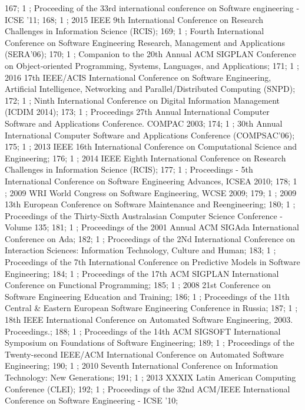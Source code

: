 167; 1 ; Proceeding of the 33rd international conference on Software engineering - ICSE '11; 
168; 1 ; 2015 IEEE 9th International Conference on Research Challenges in Information Science (RCIS); 
169; 1 ; Fourth International Conference on Software Engineering Research, Management and Applications (SERA'06); 
170; 1 ; Companion to the 20th Annual ACM SIGPLAN Conference on Object-oriented Programming, Systems, Languages, and Applications; 
171; 1 ; 2016 17th IEEE/ACIS International Conference on Software Engineering, Artificial Intelligence, Networking and Parallel/Distributed Computing (SNPD); 
172; 1 ; Ninth International Conference on Digital Information Management (ICDIM 2014); 
173; 1 ; Proceedings 27th Annual International Computer Software and Applications Conference. COMPAC 2003; 
174; 1 ; 30th Annual International Computer Software and Applications Conference (COMPSAC'06); 
175; 1 ; 2013 IEEE 16th International Conference on Computational Science and Engineering; 
176; 1 ; 2014 IEEE Eighth International Conference on Research Challenges in Information Science (RCIS); 
177; 1 ; Proceedings - 5th International Conference on Software Engineering Advances, ICSEA 2010; 
178; 1 ; 2009 WRI World Congress on Software Engineering, WCSE 2009; 
179; 1 ; 2009 13th European Conference on Software Maintenance and Reengineering; 
180; 1 ; Proceedings of the Thirty-Sixth Australasian Computer Science Conference - Volume 135; 
181; 1 ; Proceedings of the 2001 Annual ACM SIGAda International Conference on Ada; 
182; 1 ; Proceedings of the 2Nd International Conference on Interaction Sciences: Information Technology, Culture and Human; 
183; 1 ; Proceedings of the 7th International Conference on Predictive Models in Software Engineering; 
184; 1 ; Proceedings of the 17th ACM SIGPLAN International Conference on Functional Programming; 
185; 1 ; 2008 21st Conference on Software Engineering Education and Training; 
186; 1 ; Proceedings of the 11th Central {\&} Eastern European Software Engineering Conference in Russia; 
187; 1 ; 18th IEEE International Conference on Automated Software Engineering, 2003. Proceedings.; 
188; 1 ; Proceedings of the 14th ACM SIGSOFT International Symposium on Foundations of Software Engineering; 
189; 1 ; Proceedings of the Twenty-second IEEE/ACM International Conference on Automated Software Engineering; 
190; 1 ; 2010 Seventh International Conference on Information Technology: New Generations; 
191; 1 ; 2013 XXXIX Latin American Computing Conference (CLEI); 
192; 1 ; Proceedings of the 32nd ACM/IEEE International Conference on Software Engineering - ICSE '10; 
